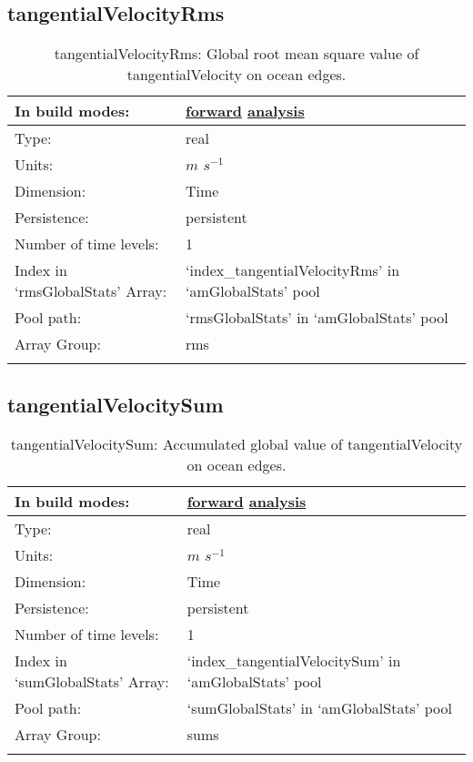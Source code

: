 \subsection[tangentialVelocityRms]{tangentialVelocityRms}
\label{subsec:var_sec_amGlobalStats_tangentialVelocityRms}
\begin{center}
\begin{longtable}{| p{2.0in} | p{4.0in} |}
        \hline 
        In build modes: & \hyperref[subsec:forward_var_tab_amGlobalStats]{forward} \hyperref[subsec:analysis_var_tab_amGlobalStats]{analysis} \\
        \hline 
        Type: & real \\
        \hline 
        Units: & $m$ $s^{-1}$ \\
        \hline 
        Dimension: & Time \\
        \hline 
        Persistence: & persistent \\
        \hline 
        Number of time levels: & 1 \\
        \hline 
		 Index in `rmsGlobalStats' Array: & `index\_tangentialVelocityRms' in `amGlobalStats' pool \\
		 \hline 
            Pool path: & `rmsGlobalStats' in `amGlobalStats' pool \\
		 \hline 
		 Array Group: & rms \\
		 \hline 
    \caption{tangentialVelocityRms: Global root mean square value of tangentialVelocity on ocean edges.}
\end{longtable}
\end{center}
\subsection[tangentialVelocitySum]{tangentialVelocitySum}
\label{subsec:var_sec_amGlobalStats_tangentialVelocitySum}
\begin{center}
\begin{longtable}{| p{2.0in} | p{4.0in} |}
        \hline 
        In build modes: & \hyperref[subsec:forward_var_tab_amGlobalStats]{forward} \hyperref[subsec:analysis_var_tab_amGlobalStats]{analysis} \\
        \hline 
        Type: & real \\
        \hline 
        Units: & $m$ $s^{-1}$ \\
        \hline 
        Dimension: & Time \\
        \hline 
        Persistence: & persistent \\
        \hline 
        Number of time levels: & 1 \\
        \hline 
		 Index in `sumGlobalStats' Array: & `index\_tangentialVelocitySum' in `amGlobalStats' pool \\
		 \hline 
            Pool path: & `sumGlobalStats' in `amGlobalStats' pool \\
		 \hline 
		 Array Group: & sums \\
		 \hline 
    \caption{tangentialVelocitySum: Accumulated global value of tangentialVelocity on ocean edges.}
\end{longtable}
\end{center}
